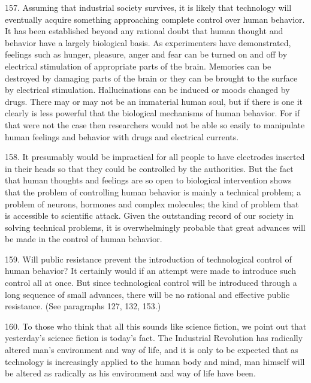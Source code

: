 \documentclass{article}
\begin{document}
157. Assuming that industrial society survives, it is likely that technology will eventually acquire 
something approaching complete control over human behavior. It has been established beyond 
any rational doubt that human thought and behavior have a largely biological basis. As 
experimenters have demonstrated, feelings such as hunger, pleasure, anger and fear can be turned 
on and off by electrical stimulation of appropriate parts of the brain. Memories can be destroyed 
by damaging parts of the brain or they can be brought to the surface by electrical 
stimulation. Hallucinations can be induced or moods changed by drugs. There may or may not 
be an immaterial human soul, but if there is one it clearly is less powerful that the biological 
mechanisms of human behavior. For if that were not the case then researchers would not be able 
so easily to manipulate human feelings and behavior with drugs and electrical currents. \vspace{\baselineskip}

158. It presumably would be impractical for all people to have electrodes inserted in their heads 
so that they could be controlled by the authorities. But the fact that human thoughts and feelings 
are so open to biological intervention shows that the problem of controlling human behavior is 
mainly a technical problem; a problem of neurons, hormones and complex molecules; the kind of 
problem that is accessible to scientific attack. Given the outstanding record of our society in 
solving technical problems, it is overwhelmingly probable that great advances will be made in the 
control of human behavior. \vspace{\baselineskip}

159. Will public resistance prevent the introduction of technological control of human behavior? 
It certainly would if an attempt were made to introduce such control all at once. But since 
technological control will be introduced through a long sequence of small advances, there will be 
no rational and effective public resistance. (See paragraphs 127, 132, 153.) \vspace{\baselineskip}

160. To those who think that all this sounds like science fiction, we point out that yesterday’s 
science fiction is today’s fact. The Industrial Revolution has radically altered man’s environment 
and way of life, and it is only to be expected that as technology is increasingly applied to the human 
body and mind, man himself will be altered as radically as his environment and way of life have 
been. 
\end{document}
